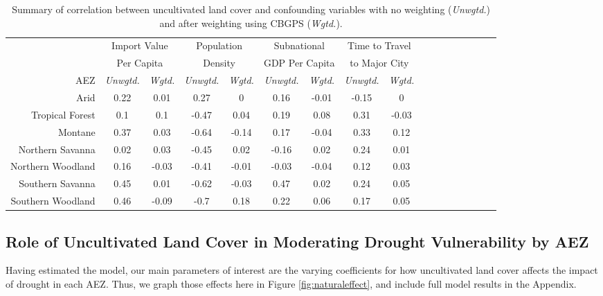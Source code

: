 \documentclass[titlepage]{article}
\begin{document}
\begin{table}[h!]
	\begin{center}
		\begin{tabular}{r | c c c c c c c c c c c c c c c c }
&	\multicolumn{2}{c}{Import Value} &	\multicolumn{2}{c}{Population} &	\multicolumn{2}{c}{Subnational}	&	\multicolumn{2}{c}{Time to Travel}	\\
&	\multicolumn{2}{c}{Per Capita} &	\multicolumn{2}{c}{Density} &	\multicolumn{2}{c}{GDP Per Capita}	&	\multicolumn{2}{c}{to Major City}	\\
	\cmidrule(lr){2-3}\cmidrule(lr){4-5} \cmidrule(lr){6-7}\cmidrule(lr){8-9}
      AEZ	&	\textit{Unwgtd.}	&	\textit{Wgtd.}	&	\textit{Unwgtd.}	&	\textit{Wgtd.}	&	\textit{Unwgtd.}	&	\textit{Wgtd.}	&	\textit{Unwgtd.}	&	\textit{Wgtd.}	\\
\hline									
Arid	&	0.22	&	0.01	&	0.27	&	0 &	0.16	&	-0.01	&	-0.15	&	0	\\
Tropical Forest	&	0.1	&	0.1	&	-0.47	&	0.04&	0.19	&	0.08	&	0.31	&	-0.03	\\
Montane	&	0.37	&	0.03	&	-0.64	&	-0.14&	0.17	&	-0.04	&	0.33	&	0.12	\\
Northern Savanna	&	0.02	&	0.03	&	-0.45	&	0.02&	-0.16	&	0.02	&	0.24	&	0.01	\\
Northern Woodland	&	0.16	&	-0.03	&	-0.41	&	-0.01&	-0.03	&	-0.04	&	0.12	&	0.03	\\
Southern Savanna	&	0.45	&	0.01	&	-0.62	&	-0.03&	0.47	&	0.02	&	0.24	&	0.05	\\
Southern Woodland	&	0.46	&	-0.09	&	-0.7	&	0.18&	0.22	&	0.06	&	0.17	&	0.05	\\	
		\end{tabular}
    \caption{Summary of correlation between uncultivated land cover and confounding variables with no weighting (\textit{Unwgtd.}) and after weighting using CBGPS (\textit{Wgtd.}).}
	\label{tab:CBPSsum}
	\end{center}
\end{table}

\subsection{Role of Uncultivated Land Cover in Moderating Drought Vulnerability by AEZ}

Having estimated the model, our main parameters of interest are the varying coefficients for how uncultivated land cover affects the impact of drought in each AEZ.  Thus, we graph those effects here in Figure \ref{fig:naturaleffect}, and include full model results in the Appendix.
\end{document}
